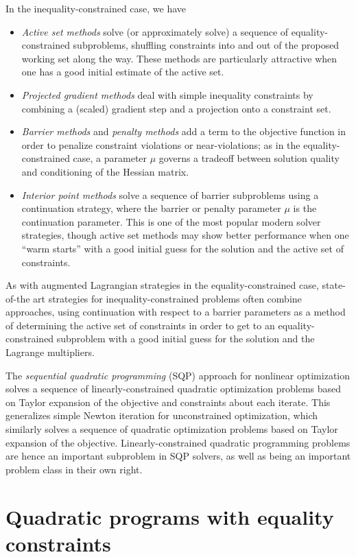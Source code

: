 \documentclass[12pt, leqno]{article} %
\begin{document}
In the inequality-constrained case, we have
\begin{itemize}
\item {\em Active set methods} solve (or approximately solve) a
  sequence of equality-constrained subproblems, shuffling constraints
  into and out of the proposed working set along the way.  These
  methods are particularly attractive when one has a good initial
  estimate of the active set.
\item
  {\em Projected gradient methods} deal with simple inequality
  constraints by combining a (scaled) gradient step and a projection
  onto a constraint set.
\item
  {\em Barrier methods} and {\em penalty methods} add a term to the
  objective function in order to penalize constraint violations or
  near-violations; as in the equality-constrained case, a parameter
  $\mu$ governs a tradeoff between solution quality and conditioning
  of the Hessian matrix.
\item
  {\em Interior point methods} solve a sequence of barrier subproblems
  using a continuation strategy, where the barrier or penalty
  parameter $\mu$ is the continuation parameter.  This is one of the
  most popular modern solver strategies, though active set methods may
  show better performance when one ``warm starts'' with a good initial
  guess for the solution and the active set of constraints.
\end{itemize}
As with augmented Lagrangian strategies in the equality-constrained
case, state-of-the art strategies for inequality-constrained problems
often combine approaches, using continuation with respect to a
barrier parameters as a method of determining the active set of
constraints in order to get to an equality-constrained subproblem with
a good initial guess for the solution and the Lagrange multipliers.

The {\em sequential quadratic programming} (SQP) approach for nonlinear
optimization solves a sequence of linearly-constrained quadratic
optimization problems based on Taylor expansion of the objective and
constraints about each iterate.  This generalizes simple Newton
iteration for unconstrained optimization, which similarly solves a
sequence of quadratic optimization problems based on Taylor expansion
of the objective.  Linearly-constrained quadratic programming problems
are hence an important subproblem in SQP solvers, as well as being an
important problem class in their own right.

\section{Quadratic programs with equality constraints}
\end{document}
